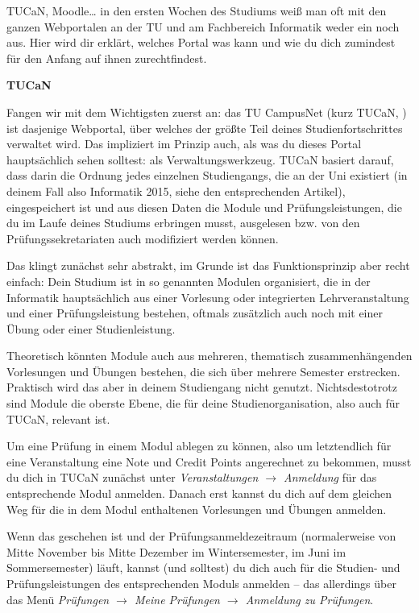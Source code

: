 {TUCaN, Moodle… in den ersten Wochen des Studiums weiß man oft mit den ganzen Webportalen an der TU und am Fachbereich Informatik weder ein noch aus. Hier wird dir erklärt, welches Portal was kann und wie du dich zumindest für den Anfang auf ihnen zurechtfindest.
}{\noindent\textbf{TUCaN}

    Fangen wir mit dem Wichtigsten zuerst an: das TU CampusNet (kurz TUCaN, \footnotemark[1]) ist dasjenige Webportal, über welches der größte Teil deines Studienfortschrittes verwaltet wird. Das impliziert im Prinzip auch, als was du dieses Portal hauptsächlich sehen solltest: als Verwaltungswerkzeug. TUCaN basiert darauf, dass darin die Ordnung jedes einzelnen Studiengangs, die an der Uni existiert (in deinem Fall also Informatik 2015, siehe den entsprechenden Artikel), eingespeichert ist und aus diesen Daten die Module und Prüfungsleistungen, die du im Laufe deines Studiums erbringen musst, ausgelesen bzw. von den Prüfungssekretariaten auch modifiziert werden können.

    Das klingt zunächst sehr abstrakt, im Grunde ist das Funktionsprinzip aber recht einfach: Dein Studium ist in so genannten Modulen organisiert, die in der Informatik hauptsächlich aus einer Vorlesung oder integrierten Lehrveranstaltung und einer Prüfungsleistung bestehen, oftmals zusätzlich auch noch mit einer Übung oder einer Studienleistung.

    Theoretisch könnten Module auch aus mehreren, thematisch zusammenhängenden Vorlesungen und Übungen bestehen, die sich über mehrere Semester erstrecken. Praktisch wird das aber in deinem Studiengang nicht genutzt. Nichtsdestotrotz sind Module die oberste Ebene, die für deine Studienorganisation, also auch für TUCaN, relevant ist.

    Um eine Prüfung in einem Modul ablegen zu können, also um letztendlich für eine Veranstaltung eine Note und Credit Points angerechnet zu bekommen, musst du dich in TUCaN zunächst unter \emph{Veranstaltungen $\rightarrow$ Anmeldung} für das entsprechende Modul anmelden. Danach erst kannst du dich auf dem gleichen Weg für die in dem Modul enthaltenen Vorlesungen und Übungen anmelden.

    Wenn das geschehen ist und der Prüfungsanmeldezeitraum (normalerweise von Mitte November bis Mitte Dezember im Wintersemester, im Juni im Sommersemester) läuft, kannst (und solltest) du dich auch für die Studien- und Prüfungsleistungen des entsprechenden Moduls anmelden – das allerdings über das Menü \emph{Prüfungen $\rightarrow$ Meine Prüfungen $\rightarrow$ Anmeldung zu Prüfungen}.

}

